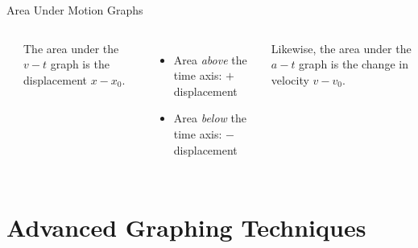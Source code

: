 \documentclass[12pt,compress,aspectratio=169,dvipsnames]{beamer}
\begin{document}
\begin{frame}{Area Under Motion Graphs}
  \begin{columns}
    \begin{center}
    \end{center}
    
    The area under the $v-t$ graph is the displacement $x-x_0$.
    \begin{itemize}
    \item Area {\color{blue!20}\emph{above}} the time axis: $+$
      displacement
    \item Area {\color{red!40}\emph{below}} the time axis: $-$ displacement
    \end{itemize}
    \vspace{.2in}Likewise, the area under the $a-t$ graph is the change in
    velocity $v-v_0$.
  \end{columns}
\end{frame}



\section{Advanced Graphing Techniques}
\end{document}

